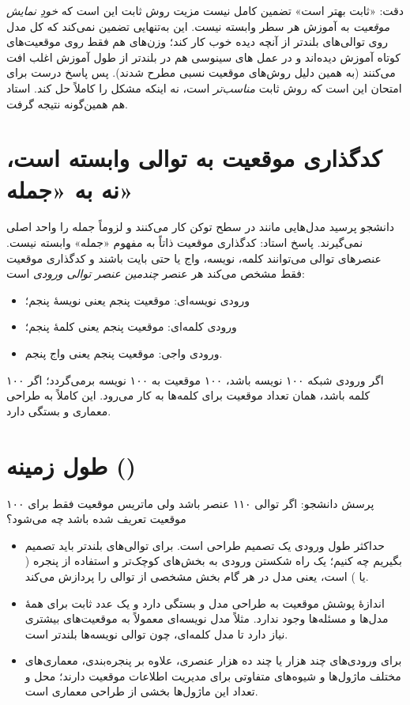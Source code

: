 \begin{correctionbox}{دقت: «ثابت بهتر است» تضمین کامل نیست}
مزیت روش ثابت این است که \emph{خودِ نمایش موقعیت} به آموزش هر سطر وابسته نیست. این به‌تنهایی تضمین نمی‌کند که کل مدل روی توالی‌های بلندتر از آنچه دیده خوب کار کند؛ وزن‌های  هم فقط روی موقعیت‌های کوتاه آموزش دیده‌اند و در عمل های سینوسی هم در بلندتر از طول آموزش اغلب افت می‌کنند (به همین دلیل روش‌های موقعیت نسبی مطرح شدند). پس پاسخ درست برای امتحان این است که روش ثابت \emph{مناسب‌تر} است، نه اینکه مشکل را کاملاً حل کند. استاد هم همین‌گونه نتیجه گرفت.
\end{correctionbox}

\section{کدگذاری موقعیت به توالی وابسته است، نه به «جمله»}
دانشجو پرسید مدل‌هایی مانند  در سطح توکن کار می‌کنند و لزوماً جمله را واحد اصلی نمی‌گیرند. پاسخ استاد: کدگذاری موقعیت ذاتاً به مفهوم «جمله» وابسته نیست. عنصرهای توالی می‌توانند کلمه، نویسه، واج یا حتی بایت باشند و کدگذاری موقعیت فقط مشخص می‌کند هر عنصر \emph{چندمین عنصر توالی ورودی} است:
\begin{itemize}
  \item ورودی نویسه‌ای: موقعیت پنجم یعنی نویسهٔ پنجم؛
  \item ورودی کلمه‌ای: موقعیت پنجم یعنی کلمهٔ پنجم؛
  \item ورودی واجی: موقعیت پنجم یعنی واج پنجم.
\end{itemize}
اگر ورودی شبکه ۱۰۰ نویسه باشد، ۱۰۰ موقعیت به ۱۰۰ نویسه برمی‌گردد؛ اگر ۱۰۰ کلمه باشد، همان تعداد موقعیت برای کلمه‌ها به کار می‌رود. این کاملاً به طراحی معماری و  بستگی دارد.

\section{طول زمینه ()}
پرسش دانشجو: اگر توالی ۱۱۰ عنصر باشد ولی ماتریس موقعیت فقط برای ۱۰۰ موقعیت تعریف شده باشد چه می‌شود؟

\begin{itemize}
  \item حداکثر طول ورودی یک تصمیم طراحی است. برای توالی‌های بلندتر باید تصمیم بگیریم چه کنیم؛ یک راه شکستن ورودی به بخش‌های کوچک‌تر و استفاده از پنجره ( یا ) است، یعنی مدل در هر گام بخش مشخصی از توالی را پردازش می‌کند.
  \item اندازهٔ پوشش موقعیت به طراحی مدل و  بستگی دارد و یک عدد ثابت برای همهٔ مدل‌ها و مسئله‌ها وجود ندارد. مثلاً مدل نویسه‌ای معمولاً به موقعیت‌های بیشتری نیاز دارد تا مدل کلمه‌ای، چون توالی نویسه‌ها بلندتر است.
  \item برای ورودی‌های چند هزار یا چند ده هزار عنصری، علاوه بر پنجره‌بندی، معماری‌های مختلف ماژول‌ها و شیوه‌های متفاوتی برای مدیریت اطلاعات موقعیت دارند؛ محل و تعداد این ماژول‌ها بخشی از طراحی معماری است.
\end{itemize}

